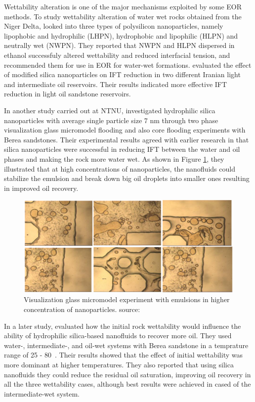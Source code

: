 Wettability alteration is one of the major mechanisms exploited by some EOR methods. To study wettability alteration of water wet rocks obtained from the Niger Delta, \citet{Onyekonwu2010} looked into three types of polysilicon nanoparticles, namely lipophobic and hydrophilic (LHPN), hydrophobic and lipophilic (HLPN) and neutrally wet (NWPN). They reported that NWPN and HLPN dispersed in ethanol successfuly altered wettability and reduced interfacial tension, and recommended them for use in EOR for water-wet formations. \citet{Roustaei2013} evaluated the effect of modified silica nanoparticles on IFT reduction in two different Iranian light and intermediate oil reservoirs. Their results indicated more effective IFT reduction in light oil sandstone reservoirs. 

In another study carried out at NTNU, \citet{Li2013} investigated hydrophilic silica nanoparticles with average single particle size 7 nm through two phase visualization glass micromodel flooding and also core flooding experiments with Berea sandstones. Their experimental results agreed with earlier research in that silica nanoparticles were successful in reducing IFT between the water and oil phases and making the rock more water wet. As shown in Figure \ref{fig:microGlass}, they illustrated that at high concentrations of nanoparticles, the nanofluids could stabilize the emulsion and break down big oil droplets into smaller ones resulting in improved oil recovery.

\begin{figure}[h]
    \centering
    \includegraphics[width=\textwidth]{img/fig/microGlass.png}
    \caption{Visualization glass micromodel experiment with emulsions in higher concentration of nanoparticles. source: \citet{Li2013}}
    \label{fig:microGlass}
\end{figure}

In a later study, \citet{Hendraningrat2014} evaluated how the initial rock wettability would influence the ability of hydrophilic silica-based nanofluids to recover more oil. They used water-, intermediate-, and oil-wet systems with Berea sandstone in a temprature range of 25 - 80~\celsius. Their results showed that the effect of initial wettability was more dominant at higher temperatures. They also reported that using silica nanofluids they could reduce the residual oil saturation, improving oil recovery in all the three wettability cases, although best results were achieved in cased of the intermediate-wet system.   

